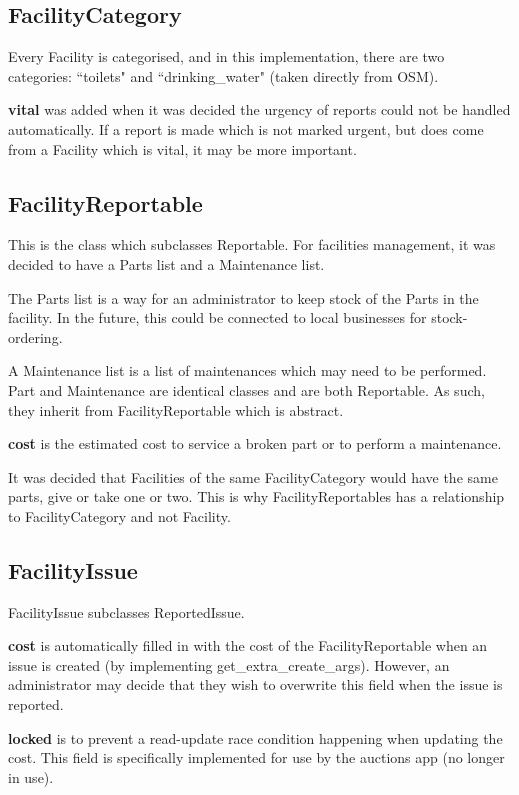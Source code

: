 \subsection{FacilityCategory} Every Facility is categorised, and in this implementation, there are two categories: ``toilets" and ``drinking\_water" (taken directly from \gls{OSM}).

\textbf{vital} was added when it was decided the urgency of reports could not be handled automatically. If a report is made which is not marked urgent, but does come from a Facility which is vital, it may be more important.

\subsection{FacilityReportable}
This is the class which subclasses Reportable. For facilities management, it was decided to have a Parts list and a Maintenance list.

The Parts list is a way for an administrator to keep stock of the Parts in the facility. In the future, this could be connected to local businesses for stock-ordering.

A Maintenance list is a list of maintenances which may need to be performed. Part and Maintenance are identical classes and are both Reportable. As such, they inherit from FacilityReportable which is abstract.

\textbf{cost} is the estimated cost to service a broken part or to perform a maintenance.

It was decided that Facilities of the same FacilityCategory would have the same parts, give or take one or two. This is why FacilityReportables has a relationship to FacilityCategory and not Facility.

\subsection{FacilityIssue}
FacilityIssue subclasses ReportedIssue.

\textbf{cost} is automatically filled in with the cost of the FacilityReportable when an issue is created (by implementing get\_extra\_create\_args). However, an administrator may decide that they wish to overwrite this field when the issue is reported.

\textbf{locked} is to prevent a read-update race condition happening when updating the cost. This field is specifically implemented for use by the auctions app (no longer in use).


